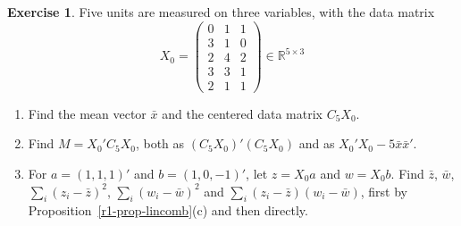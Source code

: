 \documentclass[12pt]{article}
\newcommand{\R}{\mathbb R}
\theoremstyle{definition}
\newtheorem{exercise}{Exercise}
\begin{document}
\begin{exercise}\label{r1-dr-lincomb}
Five units are measured on three variables, with the data matrix
\[
X_0=\begin{pmatrix}0&1&1\\3&1&0\\2&4&2\\3&3&1\\2&1&1\end{pmatrix}\in\R^{5\times3}
\]
\begin{enumerate}
\item Find the mean vector \(\bar x\) and the centered data matrix \(C_5X_0\).
\item Find \(M=X_0'C_5X_0\), both as \((C_5X_0)'(C_5X_0)\) and as \(X_0'X_0-5\bar x\bar x'\).
\item For \(a=(1,1,1)'\) and \(b=(1,0,-1)'\), let \(z=X_0a\) and \(w=X_0b\). Find \(\bar z\), \(\bar w\),
\(\sum_i(z_i-\bar z)^2\), \(\sum_i(w_i-\bar w)^2\) and \(\sum_i(z_i-\bar z)(w_i-\bar w)\), first by
Proposition~\ref{r1-prop-lincomb}(c) and then directly.
\end{enumerate}
\end{exercise}
\end{document}
